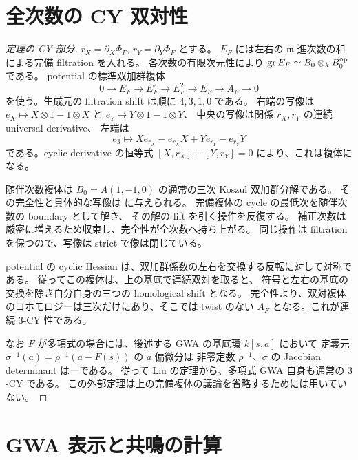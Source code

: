 \section{全次数の CY 双対性}

\begin{proof}[定理の CY 部分]
$r_X=\partial_X\Phi_F$, $r_Y=\partial_Y\Phi_F$ とする。
$E_F$ には左右の $\mathfrak m$-進次数の和による完備 filtration を入れる。
各次数の有限次元性により $\operatorname{gr} E_F\simeq B_0\otimes_kB_0^{\mathrm{op}}$ である。
potential の標準双加群複体
\[
 0\longrightarrow E_F\longrightarrow E_F^2
 \longrightarrow E_F^2\longrightarrow E_F
 \longrightarrow A_F\longrightarrow0
\]
を使う。生成元の filtration shift は順に $4,3,1,0$ である。
右端の写像は $e_X\mapsto X\otimes1-1\otimes X$ と
$e_Y\mapsto Y\otimes1-1\otimes Y$、
中央の写像は関係 $r_X,r_Y$ の連続 universal derivative、
左端は
\[
 e_3\longmapsto Xe_{r_X}-e_{r_X}X+Ye_{r_Y}-e_{r_Y}Y
\]
である。cyclic derivative の恒等式
$[X,r_X]+[Y,r_Y]=0$ により、これは複体になる。

随伴次数複体は $B_0=A(1,-1,0)$ の通常の三次 Koszul 双加群分解である。
その完全性と具体的な写像は
\cite[\S2]{ChouhyHerscovichSolotarDownUp}に与えられる。
完備複体の cycle の最低次を随伴次数の boundary として解き、
その解の lift を引く操作を反復する。
補正次数は厳密に増えるため収束し、完全性が全次数へ持ち上がる。
同じ操作は filtration を保つので、写像は strict で像は閉じている。

potential の cyclic Hessian は、双加群係数の左右を交換する反転に対して対称である。
従ってこの複体は、上の基底で連続双対を取ると、
符号と左右の基底の交換を除き自分自身の三つの homological shift となる。
完全性より、双対複体のコホモロジーは三次だけにあり、そこでは
twist のない $A_F$ となる。これが連続 $3$-CY 性である。

なお $F$ が多項式の場合には、後述する GWA の基底環 $k[s,a]$ において
定義元 $\sigma^{-1}(a)=\rho^{-1}(a-F(s))$ の $a$ 偏微分は
非零定数 $\rho^{-1}$、$\sigma$ の Jacobian determinant は一である。
従って Liu の定理から、多項式 GWA 自身も通常の $3$-CY である。
この外部定理は上の完備複体の議論を省略するためには用いていない。
\end{proof}

\section{GWA 表示と共鳴の計算}

